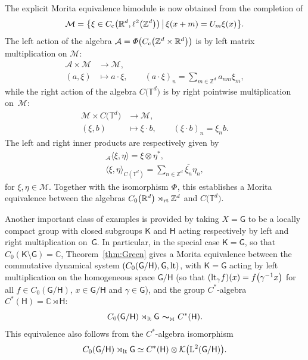 \documentclass[pdftex]{sigma}
\numberwithin{equation}{section}
\newcommand{\Z}{\zed}
\newcommand{\mbf}[1]{{\boldsymbol {#1} }}
\newcommand{\CK}{\mathcal{K}}
\newcommand{\sfG}{\mathsf{G}}
\newcommand{\sfH}{\mathsf{H}}
\newcommand{\sfK}{\mathsf{K}}
\newcommand{\Leb}{{\rm L}}
\newcommand{\lt}{{\rm lt}}
\newcommand{\rt}{{\rm rt}}
\newcommand{\complex}{{\mathbb C}} %
\newcommand{\zed}{{\mathbb Z}} %
\newcommand{\real}{{\mathbb R}} %
\newcommand{\torus}{{\mathbb T}} %
\def\alg{{\mathcal A}}
\def\Mcal{{\mathcal M}}
\begin{document}
\begin{Example}[tori]
The explicit Morita equivalence bimodule is now obtained from the
completion of
\[
\Mcal = \big\{\xi\in C_{\rm c}\big(\real^d,\ell^2\big(\Z^d\big)\big) \, \big| \, \xi(x+m) =
U_m \xi(x) \big\} .
\]
The left action of the algebra $\alg={\mit\Phi}\big(C_{\rm c}\big(\Z^d\times\real^d\big)\big)$ is by left
matrix multiplication on $\Mcal$:
\begin{align*}
\alg\times\Mcal &\longrightarrow\Mcal , \\
(a,\xi) & \longmapsto a\cdot\xi , \qquad (a\cdot\xi)_n=\sum_{m\in\Z^d}
a_{nm} \xi_m ,
\end{align*}
while the right action of the algebra $C\big(\torus^d\big)$ is by right pointwise
multiplication on~$\Mcal$:
\begin{align*}
\Mcal\times C\big(\torus^d\big) & \longrightarrow\Mcal , \nonumber \\
(\xi,b) & \longmapsto \xi\cdot b , \qquad (\xi\cdot b)_n=\xi_n b .
\end{align*}
The left and right inner
products are respectively given by
\begin{gather*}
{}_\alg\langle\xi,\eta\rangle = \xi\otimes\eta^* , \\
\langle\xi,\eta\rangle_{C(\torus^d)} = \sum_{n\in\zed^d}
\overline{\xi_n} \eta_n ,
\end{gather*}
for $\xi,\eta\in\Mcal$.
Together with the isomorphism $\mit\Phi$, this establishes a
Morita equivalence between the algebras $C_0\big(\real^d\big)\rtimes_\rt\zed^d$
and $C\big(\torus^d\big)$.
\end{Example}

Another important class of examples is provided by taking
$X=\sfG$ to be a locally
compact group with closed subgroups $\sfK$ and $\sfH$ acting respectively by
left and right multiplication on~$\sfG$.
In particular, in the special case $\sfK =\sfG$, so that
$C_0(\sfK {\setminus} \sfG)=\complex$, Theorem~\ref{thm:Green} gives a Morita equivalence between the commutative dynamical system
$(C_0(\sfG/\sfH ), \sfG, \lt)$, with $\sfK =\sfG$ acting by left multiplication on the
homogeneous space $\sfG/\sfH $ (so that $(\lt_\gamma f)(x)=f\big(\gamma^{-1} x\big)$ for all $f\in
C_0(\sfG/\sfH )$, $x\in \sfG/\sfH $ and $\gamma\in \sfG$),
and the group $C^*$-algebra $C^*(\sfH )=\complex\rtimes \sfH $:
\[
C_0(\sfG/\sfH )\rtimes_\lt \sfG \ \mbf\sim_{\text{\tiny M}} \ C^*(\sfH ) .
\]
This equivalence also follows from the $C^*$-algebra isomorphism~\cite[Theorem~4.29]{Williams2007}
\[ %
C_0(\sfG/\sfH )\rtimes_\lt \sfG \simeq C^*(\sfH )\otimes
\CK\big(\Leb^2(\sfG/\sfH )\big) .
\]
\end{document}
